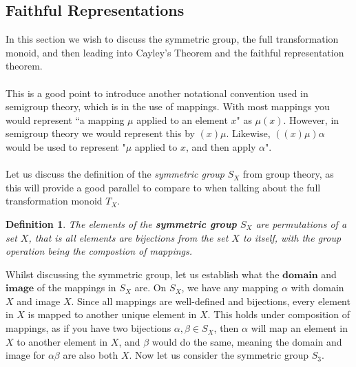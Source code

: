 \documentclass[12pt]{article}
\newtheorem{defn}[theorem]{Definition}
\begin{document}
\subsection{Faithful Representations}
In this section we wish to discuss the symmetric group, the full transformation monoid, and then leading into Cayley's Theorem and the faithful representation theorem.\\
\\This is a good point to introduce another notational convention used in semigroup theory, which is in the use of mappings. With most mappings you would represent “a mapping $\mu$ applied to an element $x$" as $\mu(x)$. However, in semigroup theory we would represent this by $(x)\mu$. Likewise, $((x)\mu)\alpha$ would be used to represent "$\mu$ applied to $x$, and then apply $\alpha$".\\
\\Let us discuss the definition of the \textit{symmetric group} $S_X$ from group theory, as this will provide a good parallel to compare to when talking about the full transformation monoid $T_X$.
\begin{defn}
	The elements of the \textbf{symmetric group} $S_X$ are permutations of a set $X$, that is all elements are bijections from the set $X$ to itself, with the group operation being the compostion of mappings.
\end{defn}
\noindent Whilst discussing the symmetric group, let us establish what the $\textbf{domain}$ and $\textbf{image}$ of the mappings in $S_X$ are. On $S_X$, we have any mapping $\alpha$ with domain $X$ and image $X$. Since all mappings are well-defined and bijections, every element in $X$ is mapped to another unique element in $X$. This holds under composition of mappings, as if you have two bijections $\alpha,\beta \in S_X$, then $\alpha$ will map an element in $X$ to another element in $X$, and $\beta$ would do the same, meaning the domain and image for $\alpha\beta$ are also both $X$.
Now let us consider the symmetric group $S_3$.
\end{document}
